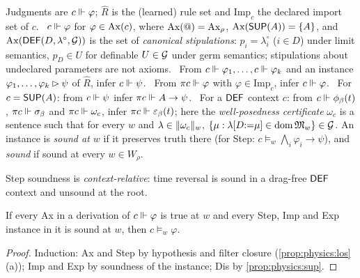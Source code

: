 \begin{definition}\label{def:physics:calculus}
Judgments are $c\Vdash\varphi$; $\hat R$ is the (learned) rule set and $\mathrm{Imp}_c$ the
declared import set of $c$. ~$c\Vdash\varphi$ for $\varphi\in\mathrm{Ax}(c)$, where
$\mathrm{Ax}(@)=\mathrm{Ax}_\rho$, $\mathrm{Ax}(\mathsf{SUP}(A))=\{A\}$, and $\mathrm{Ax}(\mathsf{DEF}(D,\lambda^\circ,\mathcal{G}))$ is the set of
\emph{canonical stipulations}: $p_i=\lambda^\circ_i$ ($i\in D$) under limit semantics,
$p_D\in U$ for definable $U\in\mathcal{G}$ under germ semantics; stipulations about undeclared
parameters are not axioms. ~From $c\Vdash\varphi_1,\dots,c\Vdash\varphi_k$ and an
instance $\varphi_1,\dots,\varphi_k\rhd\psi$ of $\hat R$, infer $c\Vdash\psi$.
~From $\pi c\Vdash\varphi$ with $\varphi\in\mathrm{Imp}_c$, infer $c\Vdash\varphi$.
~For $c=\mathsf{SUP}(A)$: from $c\Vdash\psi$ infer $\pi c\Vdash A\to\psi$. ~For a
$\mathsf{DEF}$ context $c$: from $c\Vdash\phi_\beta(t)$, $\pi c\Vdash\sigma_\beta$ and
$\pi c\Vdash\omega_c$, infer $\pi c\Vdash\varepsilon_\beta(t)$; here the
\emph{well-posedness certificate} $\omega_c$ is a sentence such that for every $w$ and
$\lambda\in\lVert \omega_c\rVert_w$, $\{\mu:\lambda[D{:=}\mu]\in\operatorname{dom}\mathfrak{M}_w\}\in\mathcal{G}$. An instance is
\emph{sound at $w$} if it preserves truth there (for Step:
$c\models_w\bigwedge_i\varphi_i\to\psi$), and \emph{sound} if sound at every $w\in W_\rho$.
\end{definition}

Step soundness is \emph{context-relative}: time reversal is sound in a drag-free $\mathsf{DEF}$
context and unsound at the root.

\begin{theorem}[Soundness]\label{thm:physics:soundness}
If every Ax in a derivation of $c\Vdash\varphi$ is true at $w$ and every Step, Imp and Exp
instance in it is sound at $w$, then $c\models_w\varphi$.
\end{theorem}
\begin{proof}
Induction: Ax and Step by hypothesis and filter closure (\cref{prop:physics:los}(a));
Imp and Exp by soundness of the instance; Dis by \cref{prop:physics:sup}.
\end{proof}

